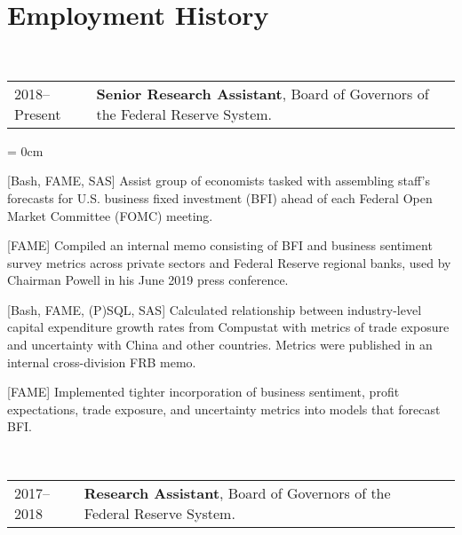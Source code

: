 \documentclass[a4paper, 11pt]{article}
\begin{document}
  \section{Employment History}
    ~\begin{tabular}{llP{15cm}}
      2018--Present & \textbf{Senior Research Assistant}, Board of Governors of the Federal Reserve System.
    \end{tabular}

    \begin{compactitem}\parskip = 0cm
      \item {[Bash, FAME, SAS]} Assist group of economists tasked with assembling staff's forecasts for U.S. business fixed investment (BFI) ahead of each Federal Open Market Committee (FOMC) meeting.
      \item {[FAME]} Compiled an internal memo consisting of BFI and business sentiment survey metrics across private sectors and Federal Reserve regional banks, used by Chairman Powell in his June 2019 press conference.
      \item {[Bash, FAME, (P)SQL, SAS]} Calculated relationship between industry-level capital expenditure growth rates from Compustat with metrics of trade exposure and uncertainty with China and other countries. Metrics were published in an internal cross-division FRB memo.
      \item {[FAME]} Implemented tighter incorporation of business sentiment, profit expectations, trade exposure, and uncertainty metrics into models that forecast BFI.
    \end{compactitem}

    \vspace*{1em}

    ~\begin{tabular}{llP{15cm}}
      2017--2018 & \textbf{Research Assistant}, Board of Governors of the Federal Reserve System.
    \end{tabular}
\end{document}
